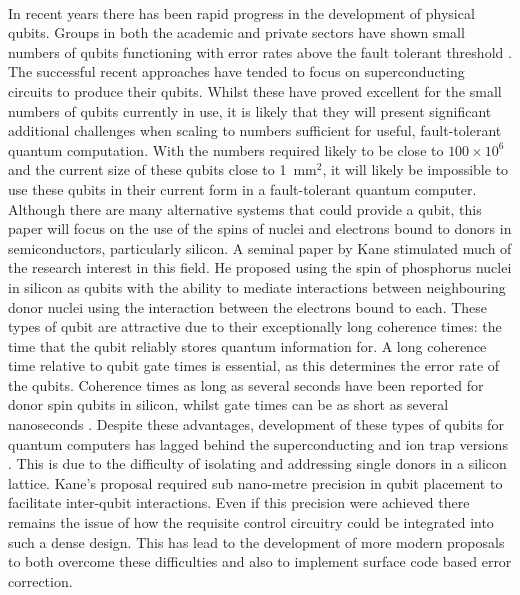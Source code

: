 \\
In recent years there has been rapid progress in the development of physical qubits.
Groups in both the academic and private sectors have shown small numbers of qubits functioning with error rates above the fault tolerant threshold \cite{Barends2015,Reagor2017}.
The successful recent approaches have tended to focus on superconducting circuits to produce their qubits.
Whilst these have proved excellent for the small numbers of qubits currently in use, it is likely that they will present significant additional challenges when scaling to numbers sufficient for useful, fault-tolerant quantum computation.
With the numbers required likely to be close to $100 \times 10^6$ and the current size of these qubits close to 1~mm$^2$, it will likely be impossible to use these qubits in their current form in a fault-tolerant quantum computer.
\\
Although there are many alternative systems that could provide a qubit, this paper will focus on the use of the spins of nuclei and electrons bound to donors in semiconductors, particularly silicon.
A seminal paper by Kane \cite{Kane1998} stimulated much of the research interest in this field.
He proposed using the spin of phosphorus nuclei in silicon as qubits with the ability to mediate interactions between neighbouring donor nuclei using the interaction between the electrons bound to each.
These types of qubit are attractive due to their exceptionally long coherence times: the time that the qubit reliably stores quantum information for. 
A long coherence time relative to qubit gate times is essential, as this determines the error rate of the qubits.
Coherence times as long as several seconds have been reported for donor spin qubits in silicon, whilst gate times can be as short as several nanoseconds \cite{Wolfowicz2013}. 
Despite these advantages, development of these types of qubits for quantum computers has lagged behind the superconducting and ion trap versions \cite{Ballance2015}. 
This is due to the difficulty of isolating and addressing single donors in a silicon lattice. 
Kane's proposal required sub nano-metre precision in qubit placement to facilitate inter-qubit interactions. 
Even if this precision were achieved there remains the issue of how the requisite control circuitry could be integrated into such a dense design.
This has lead to the development of more modern proposals to both overcome these difficulties and also to implement surface code based error correction.
\\
\\
